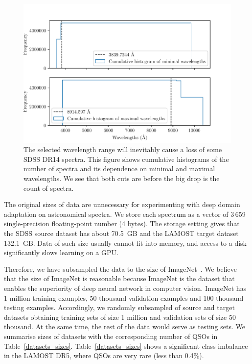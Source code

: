 \begin{figure}
\includegraphics[width=\textwidth]{img/waves_cumulative_hist.pdf}
\caption[Losts in SDSS DR14 spectra due to wavelength range]{
	The selected wavelength range will inevitably
	cause a loss of some SDSS DR14 spectra.
	This figure shows cumulative histograms of the number of spectra
	and its dependence on minimal and maximal wavelengths.
	We see that both cuts are before the big drop is the count of spectra.
	}
\label{waves_cumulative_hist}
\end{figure}

The original sizes of data are unnecessary for experimenting with deep domain adaptation on astronomical spectra.
We store each spectrum as a vector of 3\,659 single-precision floating-point number (4 bytes).
The storage setting gives that the SDSS source dataset has about 70.5~GB
and the LAMOST target dataset 132.1~GB.
Data of such size usually cannot fit into memory,
and access to a disk significantly slows learning on a GPU.

Therefore, we have subsampled the data to the size of ImageNet~\cite{russakovsky2015}.
We believe that the size of ImageNet is reasonable
because ImageNet is the dataset that enables the superiority of deep neural network in computer vision.
ImageNet has 1 million training examples, 50 thousand validation examples
and 100 thousand testing examples.
Accordingly, we randomly subsampled of source and target datasets
obtaining training sets of size 1 million
and validation sets of size 50 thousand.
At the same time, the rest of the data would serve as testing sets.
We summarise sizes of datasets with the corresponding number of QSOs in Table~\ref{datasets_sizes}.
Table~\ref{datasets_sizes} shows a significant class imbalance in the LAMOST DR5,
where QSOs are very rare (less than 0.4\%).

